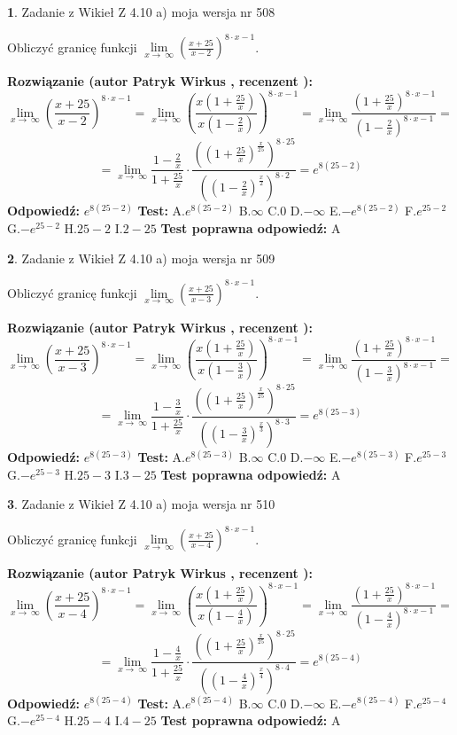 \documentclass[12pt, a4paper]{article}
\theoremstyle{definition} %
\newtheorem{zad}{}
\newcommand{\zadStart}[1]{\begin{zad}#1\newline}
\newcommand{\zadStop}{\end{zad}}
\newcommand{\rozwStart}[2]{\noindent \textbf{Rozwiązanie (autor #1 , recenzent #2): }\newline}
\newcommand{\rozwStop}{\newline}
\newcommand{\odpStart}{\noindent \textbf{Odpowiedź:}\newline}
\newcommand{\odpStop}{\newline}
\newcommand{\testStart}{\noindent \textbf{Test:}\newline}
\newcommand{\testStop}{\newline}
\newcommand{\kluczStart}{\noindent \textbf{Test poprawna odpowiedź:}\newline}
\newcommand{\kluczStop}{\newline}
\begin{document}
\zadStart{Zadanie z Wikieł Z 4.10 a) moja wersja nr 508}


Obliczyć granicę funkcji  $\lim\limits_{x\to\ \infty}(\frac{x+25}{x-2})^{8\cdot x-1}$.
\zadStop
\rozwStart{Patryk Wirkus}{}
$$\lim\limits_{x\to\ \infty}(\frac{x+25}{x-2})^{8\cdot x-1} = \lim\limits_{x\to\ \infty}(\frac{x(1+\frac{25}{x})}{x(1-\frac{2}{x})})^{8\cdot x-1}=\lim\limits_{x\to\ \infty}\frac{(1+\frac{25}{x})^{8\cdot x-1}}{(1-\frac{2}{x})^{8\cdot x-1}}=$$
$$=\lim\limits_{x\to\ \infty}\frac{1-\frac{2}{x}}{1+\frac{25}{x}}\cdot\frac{((1+\frac{25}{x})^{\frac{x}{25}})^{8\cdot25}}{((1-\frac{2}{x})^{\frac{x}{2}})^{8\cdot2}}=e^{8(25-2)}$$
\rozwStop
\odpStart
$e^{8(25-2)}$
\odpStop
\testStart
A.$e^{8(25-2)}$ B.$\infty$ C.$0$ D.$-\infty$ E.$-e^{8(25-2)}$
F.$e^{25-2}$ G.$-e^{25-2}$
H.$25-2$
I.$2-25$
\testStop
\kluczStart
A
\kluczStop



\zadStart{Zadanie z Wikieł Z 4.10 a) moja wersja nr 509}


Obliczyć granicę funkcji  $\lim\limits_{x\to\ \infty}(\frac{x+25}{x-3})^{8\cdot x-1}$.
\zadStop
\rozwStart{Patryk Wirkus}{}
$$\lim\limits_{x\to\ \infty}(\frac{x+25}{x-3})^{8\cdot x-1} = \lim\limits_{x\to\ \infty}(\frac{x(1+\frac{25}{x})}{x(1-\frac{3}{x})})^{8\cdot x-1}=\lim\limits_{x\to\ \infty}\frac{(1+\frac{25}{x})^{8\cdot x-1}}{(1-\frac{3}{x})^{8\cdot x-1}}=$$
$$=\lim\limits_{x\to\ \infty}\frac{1-\frac{3}{x}}{1+\frac{25}{x}}\cdot\frac{((1+\frac{25}{x})^{\frac{x}{25}})^{8\cdot25}}{((1-\frac{3}{x})^{\frac{x}{3}})^{8\cdot3}}=e^{8(25-3)}$$
\rozwStop
\odpStart
$e^{8(25-3)}$
\odpStop
\testStart
A.$e^{8(25-3)}$ B.$\infty$ C.$0$ D.$-\infty$ E.$-e^{8(25-3)}$
F.$e^{25-3}$ G.$-e^{25-3}$
H.$25-3$
I.$3-25$
\testStop
\kluczStart
A
\kluczStop



\zadStart{Zadanie z Wikieł Z 4.10 a) moja wersja nr 510}


Obliczyć granicę funkcji  $\lim\limits_{x\to\ \infty}(\frac{x+25}{x-4})^{8\cdot x-1}$.
\zadStop
\rozwStart{Patryk Wirkus}{}
$$\lim\limits_{x\to\ \infty}(\frac{x+25}{x-4})^{8\cdot x-1} = \lim\limits_{x\to\ \infty}(\frac{x(1+\frac{25}{x})}{x(1-\frac{4}{x})})^{8\cdot x-1}=\lim\limits_{x\to\ \infty}\frac{(1+\frac{25}{x})^{8\cdot x-1}}{(1-\frac{4}{x})^{8\cdot x-1}}=$$
$$=\lim\limits_{x\to\ \infty}\frac{1-\frac{4}{x}}{1+\frac{25}{x}}\cdot\frac{((1+\frac{25}{x})^{\frac{x}{25}})^{8\cdot25}}{((1-\frac{4}{x})^{\frac{x}{4}})^{8\cdot4}}=e^{8(25-4)}$$
\rozwStop
\odpStart
$e^{8(25-4)}$
\odpStop
\testStart
A.$e^{8(25-4)}$ B.$\infty$ C.$0$ D.$-\infty$ E.$-e^{8(25-4)}$
F.$e^{25-4}$ G.$-e^{25-4}$
H.$25-4$
I.$4-25$
\testStop
\kluczStart
A
\kluczStop
\end{document}
